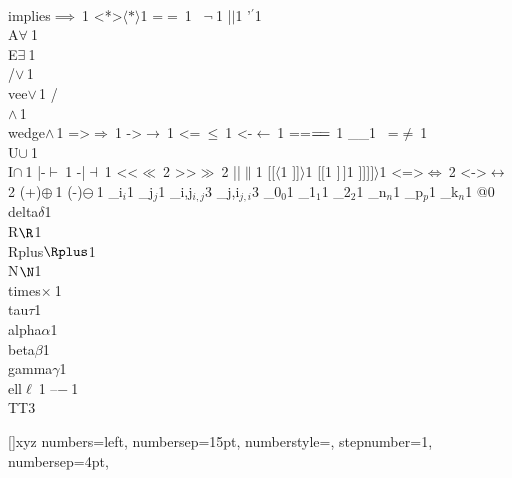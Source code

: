 {		{\\implies}{{$\implies\ $}}1
		{<*>}{{$\langle*\rangle$}}1
		{=}{{$=\ $}}1
		{~}{{$\neg\ $}}1
		{|}{{$\mid$}}1
		{'}{{$^\prime$}}1
		{\\A}{{$\forall\ $}}1
		{\\E}{{$\exists\ $}}1
		{\\/}{{$\vee\,$}}1
		{\\vee}{{$\vee\,$}}1
		{/\\}{{$\wedge\,$}}1
		{\\wedge}{{$\wedge\,$}}1
		{=>}{{$\Rightarrow\ $}}1
		{->}{{$\rightarrow\ $}}1
		{<=}{{$\ \leq\ $}}1
		{<-}{{$\leftarrow\ $}}1
		{==}{{$=\mathrel{\mkern-3mu}=\ $}}1
		{_}{{\_}}1
		{~=}{{$\neq\ $}}1
		{\\U}{{$\cup\ $}}1
		{\\I}{{$\cap\ $}}1
		{|-}{{$\vdash\ $}}1
		{-|}{{$\dashv\ $}}1
		{<<}{{$\ll\ $}}2
		{>>}{{$\gg\ $}}2
		{||}{{$\|$}}1
		{[[}{{$\langle$}}1
		{]]}{{$\rangle$}}1
		{[}{{$[$}}1
		{]}{{$\,]$}}1
		{]]]}{{$]\rangle$}}1
		{<=>}{{$\Leftrightarrow\ $}}2
		{<->}{{$\leftrightarrow\ $}}2
		{(+)}{{$\oplus\ $}}1
		{(-)}{{$\ominus\ $}}1
		{_i}{{$_{i}$}}1
		{_j}{{$_{j}$}}1
		{_{i,j}}{{$_{i,j}$}}3
		{_{j,i}}{{$_{j,i}$}}3
		{_0}{{$_0$}}1
		{_1}{{$_1$}}1
		{_2}{{$_2$}}1
		{_n}{{$_n$}}1
		{_p}{{$_p$}}1
		{_k}{{$_n$}}1
		{@}{{}}0
		{\\delta}{{$\delta$}}1
		{\\R}{{$\R$}}1
		{\\Rplus}{{$\Rplus$}}1
		{\\N}{{$\N$}}1
		{\\times}{{$\times\ $}}1
		{\\tau}{{$\tau$}}1
		{\\alpha}{{$\alpha$}}1
		{\\beta}{{$\beta$}}1
		{\\gamma}{{$\gamma$}}1
		{\\ell}{{$\ell\ $}}1
		{--}{{$-\ $}}1
		{\\TT}{{\hspace{1.5em}}}3
	}
	
	
	[]{xyz}
	{
		numbers=left,
		numbersep=15pt,
		numberstyle=\tiny,
		stepnumber=1,
		numbersep=4pt,
	}
	
